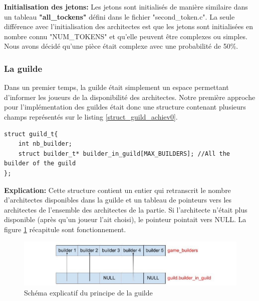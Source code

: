 \documentclass{article}
\begin{document}
        
        \vspace{1cm}\textbf{Initialisation des jetons:} Les jetons sont initialisés de manière similaire dans un tableau \textbf{"all\_tockens"} défini dans le fichier "second\_token.c". La seule différence avec l'initialisation des architectes est que les jetons sont initialisées en nombre connu "NUM\_TOKENS" et qu'elle peuvent être complexes ou simples. Nous avons décidé qu'une pièce était complexe avec une probabilité de 50\%.
        
        \subsubsection{La guilde}

        \hspace{1em} Dans un premier temps, la guilde était simplement un espace permettant d'informer les joueurs de la disponibilité des architectes.
       Notre première approche pour l'implémentation des guildes était donc une structure contenant plusieurs champs représentés sur le listing \ref{struct_guild_achiev0}.  

   \vspace{1em}

        \begin{lstlisting}[frame=single, caption={Code de la structure de la guild pour de l'achievement 0},label={struct_guild_achiev0}]
struct guild_t{
    int nb_builder;
    struct builder_t* builder_in_guild[MAX_BUILDERS]; //All the builder of the guild
};

    \end{lstlisting}
   
   \vspace{1em}
        \textbf{Explication:} Cette structure contient un entier qui retranscrit le nombre d'architectes disponibles dans la guilde et un tableau de pointeurs vers les architectes de l'ensemble des architectes de la partie. Si l'architecte n'était plus disponible (après qu'un joueur l'ait choisi), le pointeur pointait vers NULL. La figure \ref{schema_guild} récapitule sont fonctionnement.

         
        \begin{figure}[!ht]
            \centering
            \includegraphics[width=\linewidth]{schema_guild.jpg}
            \caption{Schéma explicatif du principe de la guilde}
            \label{schema_guild}
        \end{figure}
\end{document}
